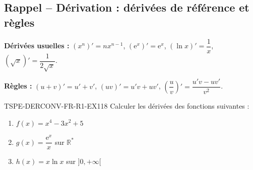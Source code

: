 

\subsection*{Rappel -- Dérivation : dérivées de référence et règles}

\textbf{Dérivées usuelles :} $(x^n)' = n x^{n-1}$, $(\mathrm{e}^x)' = \mathrm{e}^x$, $(\ln x)' = \dfrac{1}{x}$, $(\sqrt{x})' = \dfrac{1}{2\sqrt{x}}$.

\textbf{Règles :} $(u+v)' = u' + v'$, $(uv)' = u'v + uv'$, $\left(\dfrac{u}{v}\right)' = \dfrac{u'v - uv'}{v^2}$.

\begin{exercice}{TSPE-DERCONV-FR-R1-EX1}{1}{8}
Calculer les dérivées des fonctions suivantes :
\begin{enumerate}
  \item $f(x) = x^4 - 3x^2 + 5$
  \item $g(x) = \dfrac{\mathrm{e}^x}{x}$ sur $\mathbb{R}^*$
  \item $h(x) = x \ln x$ sur $]0, +\infty[$
\end{enumerate}
\end{exercice}

